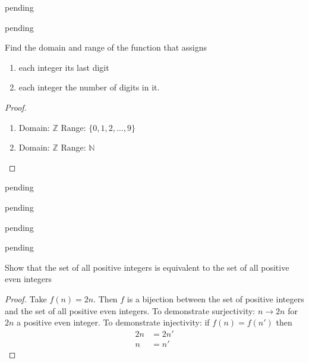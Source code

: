 \begin{exercise} \label{0.33}
	pending
\end{exercise}

\begin{exercise} \label{0.34}
	pending
\end{exercise}

\begin{exercise} \label{0.35}
	Find the domain and range of the function that assigns 
	\begin{enumerate}[label=(\alph*)]
	    \item each integer its last digit
	    \item each integer the number of digits in it.
	\end{enumerate}
	    
	\begin{proof}
	    \begin{enumerate}[label=(\alph*)]
	        \item Domain: $\mathbb{Z}$
	        Range: $\{ 0,1,2,\ldots,9 \}$
	        
	        \item Domain: $\mathbb{Z}$
	        Range: $\mathbb{N}$
	    \end{enumerate}
	\end{proof}
\end{exercise}

\begin{exercise} \label{0.36}
	pending
\end{exercise}

\begin{exercise} \label{0.37}
	pending
\end{exercise}

\begin{exercise} \label{0.38}
	pending
\end{exercise}

\begin{exercise} \label{0.39}
	pending
\end{exercise}

\begin{exercise} \label{0.40}
	Show that the set of all positive integers is equivalent to the set of all positive even integers
	
	\begin{proof}
	    Take $f(n)=2n$. Then $f$ is a bijection between the set of positive integers and the set of all positive even integers. To demonstrate surjectivity: $n \rightarrow 2n$ for $2n$ a positive even integer. To demonstrate injectivity: if $f(n)=f(n')$ then 
	    \begin{align*}
	        2n &= 2n' \\
	        n &= n'
	    \end{align*}
	\end{proof}
\end{exercise}

